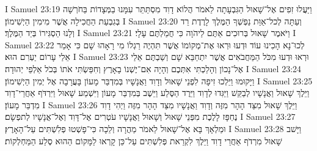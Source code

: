 I Samuel 23:19	וַיַּעֲלוּ זִפִים אֶל־שָׁאוּל הַגִּבְעָתָה לֵאמֹר הֲלוֹא דָוִד מִסְתַּתֵּר עִמָּנוּ בַמְּצָדוֹת בַּחֹרְשָׁה בְּגִבְעַת הַחֲכִילָה אֲשֶׁר מִימִין הַיְשִׁימוֹן׃
I Samuel 23:20	וְעַתָּה לְכל־אַוַּת נַפְשְׁךָ הַמֶּלֶךְ לָרֶדֶת רֵד וְלָנוּ הַסְגִּירוֹ בְּיַד הַמֶּלֶךְ׃
I Samuel 23:21	וַיֹּאמֶר שָׁאוּל בְּרוּכִים אַתֶּם לַיהֹוָה כִּי חֲמַלְתֶּם עָלָי׃
I Samuel 23:22	לְכוּ־נָא הָכִינוּ עוֹד וּדְעוּ וּרְאוּ אֶת־מְקוֹמוֹ אֲשֶׁר תִּהְיֶה רַגְלוֹ מִי רָאָהוּ שָׁם כִּי אָמַר אֵלַי עָרוֹם יַעְרִם הוּא׃
I Samuel 23:23	וּרְאוּ וּדְעוּ מִכֹּל הַמַּחֲבֹאִים אֲשֶׁר יִתְחַבֵּא שָׁם וְשַׁבְתֶּם אֵלַי אֶל־נָכוֹן וְהָלַכְתִּי אִתְּכֶם וְהָיָה אִם־יֶשְׁנוֹ בָאָרֶץ וְחִפַּשְׂתִּי אֹתוֹ בְּכֹל אַלְפֵי יְהוּדָה׃
I Samuel 23:24	וַיָּקוּמוּ וַיֵּלְכוּ זִיפָה לִפְנֵי שָׁאוּל וְדָוִד וַאֲנָשָׁיו בְּמִדְבַּר מָעוֹן בָּעֲרָבָה אֶל יְמִין הַיְשִׁימוֹן׃
I Samuel 23:25	וַיֵּלֶךְ שָׁאוּל וַאֲנָשָׁיו לְבַקֵּשׁ וַיַּגִּדוּ לְדָוִד וַיֵּרֶד הַסֶּלַע וַיֵּשֶׁב בְּמִדְבַּר מָעוֹן וַיִּשְׁמַע שָׁאוּל וַיִּרְדֹּף אַחֲרֵי־דָוִד מִדְבַּר מָעוֹן׃
I Samuel 23:26	וַיֵּלֶךְ שָׁאוּל מִצַּד הָהָר מִזֶּה וְדָוִד וַאֲנָשָׁיו מִצַּד הָהָר מִזֶּה וַיְהִי דָוִד נֶחְפָּז לָלֶכֶת מִפְּנֵי שָׁאוּל וְשָׁאוּל וַאֲנָשָׁיו עֹטְרִים אֶל־דָּוִד וְאֶל־אֲנָשָׁיו לְתפְשָׂם׃
I Samuel 23:27	וּמַלְאָךְ בָּא אֶל־שָׁאוּל לֵאמֹר מַהֲרָה וְלֵכָה כִּי־פָשְׁטוּ פְלִשְׁתִּים עַל־הָאָרֶץ׃
I Samuel 23:28	וַיָּשׁב שָׁאוּל מִרְדֹף אַחֲרֵי דָוִד וַיֵּלֶךְ לִקְרַאת פְּלִשְׁתִּים עַל־כֵּן קָרְאוּ לַמָּקוֹם הַהוּא סֶלַע הַמַּחְלְקוֹת׃
